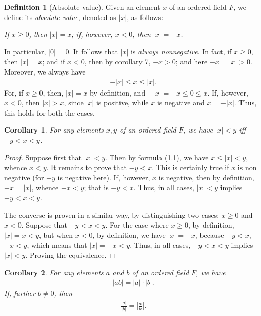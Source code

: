 \documentclass[12pt]{book}
\newtheorem{corollary}{Corollary}
\theoremstyle{definition}
\newtheorem{definition}{Definition}[section]
\begin{document}
\begin{definition}[Absolute value]

\indent

Given an element $x$ of an ordered field $F$, we define its \textit{absolute value}, denoted as $|x|$, as follows:
\begin{center}
	\textit{If $x\geq 0$, then $|x|=x$; if, however, $x<0$, then $|x|=-x$.}
\end{center}
In particular, $|0|=0$. It follows that $|x|$ is \textit{always nonnegative}. In fact, if $x\geq 0$, then $|x|=x$; and if $x<0$, then by corollary 7, $-x>0$; and here $-x = |x| >0$. Moreover, we always have
\begin{align}
-|x| \leq x \leq |x|.	
\end{align}
For, if $x \geq 0$, then, $|x|=x$ by definition, and $-|x| =-x \leq 0 \leq x$. If, however, $x<0$, then $|x|>x$, since $|x|$ is positive, while $x$ is negative and $x=-|x|$. Thus, this holds for both the cases.   	
\end{definition}
\begin{corollary}
	For any elements $x,y$ of an ordered field $F$, we have $|x|<y$ iff $-y<x<y$.
\end{corollary}
\begin{proof}
	Suppose first that $|x|<y$. Then by formula (1.1), we have $x \leq |x| <y$, whence $x<y$. It remains to prove that $-y<x$. This is certainly true if $x$ is non negative (for $-y$ is negative here). If, however, $x$ is negative, then by definition, $-x =|x|$, whence $-x<y$; that is $-y<x$. Thus, in all cases, $|x|<y$ implies $-y<x<y$.

The converse is proven in a similar way, by distinguishing two cases: $x\geq 0$ and $x<0$. Suppose that $-y < x <y$. For the case where $x \geq 0$, by definition, $|x| =x <y$, but when $x<0$, by definition, we have $|x|=-x$, because $-y<x$, $-x<y$, which means that $|x| =-x <y$. Thus, in all cases, $-y<x<y$ implies $|x|<y$. Proving the equivalence. 
\end{proof}
\begin{corollary}
	For any elements $a$ and $b$ of an ordered field $F$, we have
	\begin{align*}
	|ab| = |a|\cdot |b|.	
	\end{align*}
If, further $b\neq 0$, then
\begin{align*}
\frac{|a|}{|b|} = \left| \frac{a}{b} \right|. 	
\end{align*}
\end{corollary}
\end{document}

